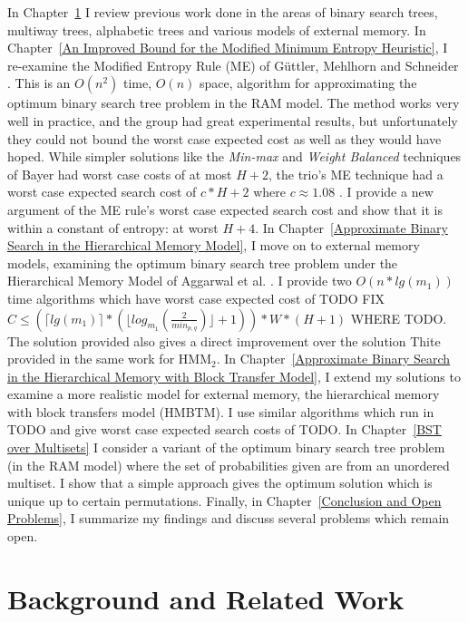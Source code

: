 \documentclass[letterpaper,12pt,titlepage,oneside,final]{book}
\theoremstyle{plain}
\begin{document}
In Chapter~\ref{Background and Related Work} I review previous work done in the areas of binary search trees, multiway trees, alphabetic trees and various models of external memory. In Chapter~\ref{An Improved Bound for the Modified Minimum Entropy Heuristic}, I re-examine the Modified Entropy Rule (ME) of G{\"u}ttler, Mehlhorn and Schneider \cite{guttler1980binary}. This is an $O(n^2)$ time, $O(n)$ space, algorithm for approximating the optimum binary search tree problem in the RAM model. The method works very well in practice, and the group had great experimental results, but unfortunately they could not bound the worst case expected cost as well as they would have hoped. While simpler solutions like the \textit{Min-max} and \textit{Weight Balanced} techniques of Bayer had worst case costs of at most $H+2$, the trio's ME technique had a worst case expected search cost of $c*H+2$ where $c \approx 1.08$ \cite{bayer1975improved} \cite{guttler1980binary}. I provide a new argument of the ME rule's worst case expected search cost and show that it is within a constant of entropy: at worst $H+4$. In Chapter~\ref{Approximate Binary Search in the Hierarchical Memory Model}, I move on to external memory models, examining the optimum binary search tree problem under the Hierarchical Memory Model of Aggarwal et al. \cite{aggarwal1987model} . I provide two $O(n*lg(m_1))$ time algorithms which have worst case expected cost of TODO FIX $C \leq (\lceil lg(m_1) \rceil * (\lfloor log_{m_1}(\frac{2}{min_{p,q}}) \rfloor + 1)) * W * (H + 1)$ WHERE TODO. The solution provided also gives a direct improvement over the solution Thite provided in the same work for HMM$_2$. In Chapter~\ref{Approximate Binary Search in the Hierarchical Memory with Block Transfer Model}, I extend my solutions to examine a more realistic model for external memory, the hierarchical memory with block transfers model (HMBTM). I use similar algorithms which run in TODO and give worst case expected search costs of TODO. In Chapter~\ref{BST over Multisets} I consider a variant of the optimum binary search tree problem (in the RAM model) where the set of probabilities given are from an unordered multiset. I show that a simple approach gives the optimum solution which is unique up to certain permutations. Finally, in Chapter~\ref{Conclusion and Open Problems}, I summarize my findings and discuss several problems which remain open.


\chapter{Background and Related Work} \label{Background and Related Work}
\end{document}
